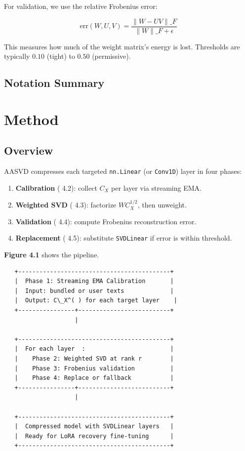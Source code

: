 For validation, we use the relative Frobenius error:

\[
\text{err}(W, U, V) = \frac{\|W - UV\|\_F}{\|W\|\_F + \epsilon}
\tag{3.11}
\]

This measures how much of the weight matrix's energy is lost. Thresholds 
are typically $0.10$ (tight) to $0.50$ (permissive).

\subsection{Notation Summary}



\section{Method}

\subsection{Overview}

AASVD compresses each targeted \texttt{nn.Linear} (or \texttt{Conv1D}) layer in four phases:

\begin{enumerate}
\item \textbf{Calibration} ( 4.2): collect $C_X$ per layer via streaming EMA.
\item \textbf{Weighted SVD} ( 4.3): factorize $W C_X^{1/2}$, then unweight.
\item \textbf{Validation} ( 4.4): compute Frobenius reconstruction error.
\item \textbf{Replacement} ( 4.5): substitute \texttt{SVDLinear} if error is within threshold.

\end{enumerate}
\textbf{Figure 4.1} shows the pipeline.

\begin{lstlisting}
   +-------------------------------------------+
   |  Phase 1: Streaming EMA Calibration       |
   |  Input: bundled or user texts             |
   |  Output: C\_X^( ) for each target layer    |
   +----------------+--------------------------+
                    |
                     
   +-------------------------------------------+
   |  For each layer  :                        |
   |    Phase 2: Weighted SVD at rank r        |
   |    Phase 3: Frobenius validation          |
   |    Phase 4: Replace or fallback           |
   +----------------+--------------------------+
                    |
                     
   +-------------------------------------------+
   |  Compressed model with SVDLinear layers   |
   |  Ready for LoRA recovery fine-tuning      |
   +-------------------------------------------+
\end{lstlisting}

